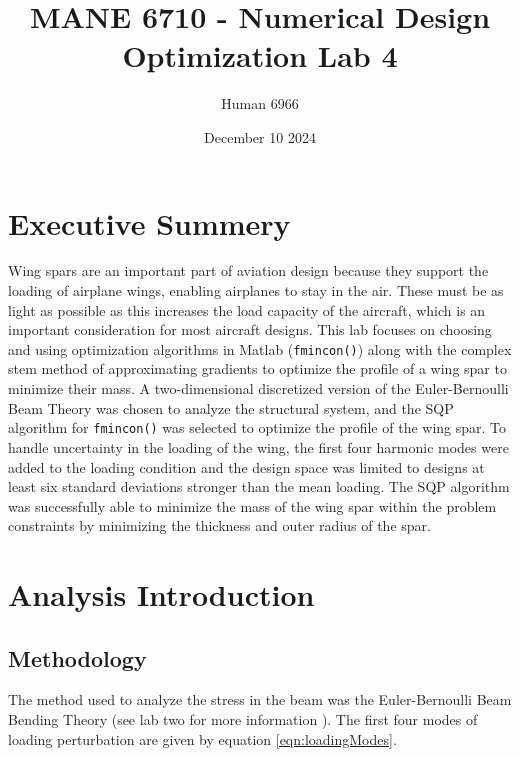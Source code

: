 \documentclass[11pt]{article}%
\title{MANE 6710 - Numerical Design Optimization Lab 4}
\author{Human 6966}
\date{December 10 2024}
\begin{document}
\maketitle
\newpage
\tableofcontents
\newpage
{}
\section*{Executive Summery}
\label{sec:abstract}

Wing spars are an important part of aviation design because they support the loading of airplane wings, enabling airplanes to stay in the air. These must be as light as possible as this increases the load capacity of the aircraft, which is an important consideration for most aircraft designs. This lab focuses on choosing and using optimization algorithms in Matlab (\lstinline{fmincon()}) along with the complex stem method of approximating gradients to optimize the profile of a wing spar to minimize their mass. A two-dimensional discretized version of the Euler-Bernoulli Beam Theory was chosen to analyze the structural system, and the SQP algorithm for \lstinline{fmincon()} was selected to optimize the profile of the wing spar. To handle uncertainty in the loading of the wing, the first four harmonic modes were added to the loading condition and the design space was limited to designs at least six standard deviations stronger than the mean loading. The SQP algorithm was successfully able to minimize the mass of the wing spar within the problem constraints by minimizing the thickness and outer radius of the spar.

\section{Analysis Introduction}
\label{sec:intro}

\subsection {Methodology}
\label{sec:analysismethod}

The method used to analyze the stress in the beam was the Euler-Bernoulli Beam Bending Theory (see lab two for more information \cite{lab2}). The first four modes of loading perturbation are given by equation \ref{eqn:loadingModes}.
\end{document}
